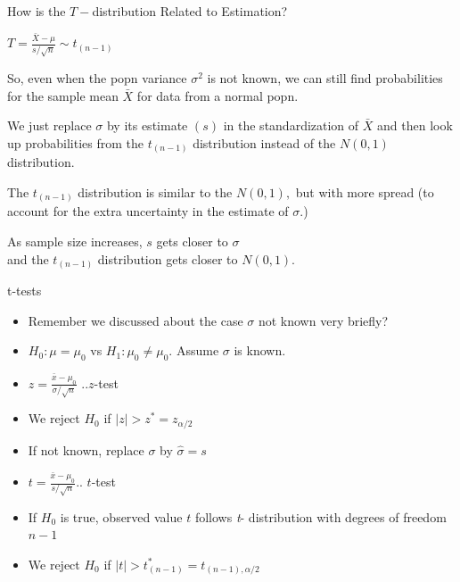 \documentclass{beamer}\usepackage[]{graphicx}\usepackage[]{color}
\begin{document}
\begin{frame}{How is the $T-$distribution Related to Estimation?}

$T = \frac{\bar{X}-\mu}{s/\sqrt{n}} \sim t_{(n-1)}$ \pause

\bigskip

So, even when the popn variance $\sigma^2$ is not known, we can
still find probabilities for the sample mean $\bar{X}$ for data from a
normal popn. \pause  
\medskip

We just replace $\sigma$ by its estimate $(s)$ in the standardization of
$\bar{X}$ and then look up probabilities from the $t_{(n-1)}$ distribution
instead of the $N(0,1)$ distribution. \pause
\bigskip

The $t_{(n-1)}$ distribution is similar to the $N(0,1),$ but with more
spread (to account for the extra uncertainty in the estimate of $\sigma$.)
\medskip \pause

As sample size increases, $s$ gets closer to $\sigma$ \\
and the $t_{(n-1)}$ distribution gets closer to $N(0,1).$ \pause

\end{frame}

\begin{frame}{t-tests}

\begin{itemize}
\item Remember we discussed about the case $\sigma$ not known very briefly? \pause
\item $H_0: \mu= \mu_0$ vs $H_1: \mu_0 \neq \mu_0$. Assume $\sigma$ is known.
\item $z=\frac{\bar{x}-\mu_0}{\sigma/\sqrt{n}}$ ..\pause  $z$-test \pause
\item We reject $H_0$ if $|z|>z^*=z_{\alpha/2}$ \pause
\item If not known, replace $\sigma$ by $\hat{\sigma}=s$ \pause
\item $t=\frac{\bar{x}-\mu_0}{s/\sqrt{n}}$\pause..  $t$-test \pause
\item If $H_0$ is true, observed value $t$ follows \textit{t}- distribution with degrees of freedom $n-1$ \pause
\item We reject $H_0$ if $|t|>t_{(n-1)}^*=t_{(n-1),\alpha/2}$
\end{itemize}
\end{frame}
\end{document}
